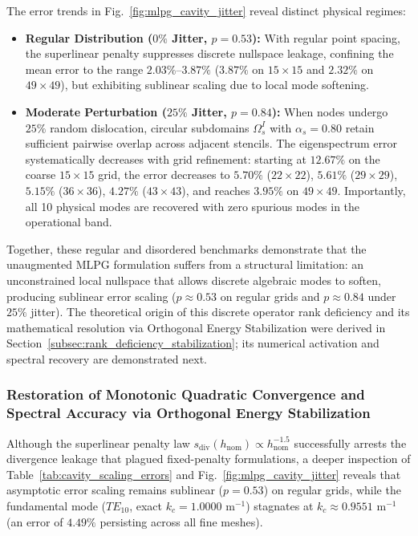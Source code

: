 \documentclass[VANCOUVER,Times1COL]{WileyNJD-v5}
\begin{document}
The error trends in Fig.~\ref{fig:mlpg_cavity_jitter} reveal distinct physical regimes:
\begin{itemize}
    \item \textbf{Regular Distribution ($0\%$ Jitter, $p = 0.53$):} With regular point spacing, the superlinear penalty suppresses discrete nullspace leakage, confining the mean error to the range $2.03\%\text{--}3.87\%$ ($3.87\%$ on $15\times 15$ and $2.32\%$ on $49\times 49$), but exhibiting sublinear scaling due to local mode softening.
    \item \textbf{Moderate Perturbation ($25\%$ Jitter, $p = 0.84$):} When nodes undergo $25\%$ random dislocation, circular subdomains $\Omega_s^I$ with $\alpha_s = 0.80$ retain sufficient pairwise overlap across adjacent stencils. The eigenspectrum error systematically decreases with grid refinement: starting at $12.67\%$ on the coarse $15 \times 15$ grid, the error decreases to $5.70\%$ ($22\times 22$), $5.61\%$ ($29\times 29$), $5.15\%$ ($36\times 36$), $4.27\%$ ($43\times 43$), and reaches $\mathbf{3.95\%}$ on $49 \times 49$. Importantly, all 10 physical modes are recovered with zero spurious modes in the operational band.
\end{itemize}

Together, these regular and disordered benchmarks demonstrate that the unaugmented MLPG formulation suffers from a structural limitation: an unconstrained local nullspace that allows discrete algebraic modes to soften, producing sublinear error scaling ($p \approx 0.53$ on regular grids and $p \approx 0.84$ under $25\%$ jitter). The theoretical origin of this discrete operator rank deficiency and its mathematical resolution via Orthogonal Energy Stabilization were derived in Section~\ref{subsec:rank_deficiency_stabilization}; its numerical activation and spectral recovery are demonstrated next.

\subsubsection{Restoration of Monotonic Quadratic Convergence and Spectral Accuracy via Orthogonal Energy Stabilization}
\label{subsubsec:resolution_stagnation_stabilization}

Although the superlinear penalty law $s_{\mathrm{div}}(h_{\mathrm{nom}}) \propto h_{\mathrm{nom}}^{-1.5}$ successfully arrests the divergence leakage that plagued fixed-penalty formulations, a deeper inspection of Table~\ref{tab:cavity_scaling_errors} and Fig.~\ref{fig:mlpg_cavity_jitter} reveals that asymptotic error scaling remains sublinear ($p = 0.53$) on regular grids, while the fundamental mode ($TE_{10}$, exact $k_c = 1.0000\text{ m}^{-1}$) stagnates at $k_c \approx 0.9551\text{ m}^{-1}$ (an error of $4.49\%$ persisting across all fine meshes).
\end{document}
